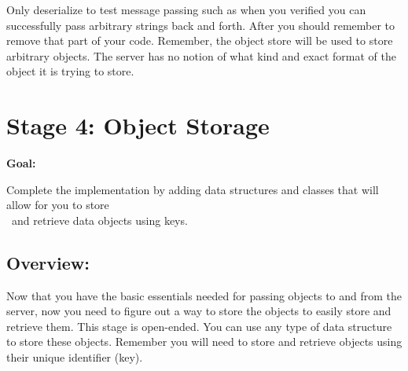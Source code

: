 \documentclass{article}
\begin{document}
\begin{info}
 Only deserialize to test message passing such as when you verified you can successfully pass arbitrary strings back and forth. After you should remember to remove that part of your code. Remember, the object store will be used to store arbitrary objects. The server has no notion of what kind and exact format of the object it is trying to store. 
\end{info}

\newpage
\section{Stage 4: Object Storage} %
\begin{large}\textbf{Goal:}\end{large} Complete the implementation by adding data structures and classes that will allow for you to store \\ \indent \indent \-\ and retrieve data objects using keys. 

\subsection*{Overview:}
Now that you have the basic essentials needed for passing objects to and from the server, now you need to figure out a way to store the objects to easily store and retrieve them. This stage is open-ended. You can use any type of data structure to store these objects. Remember you will need to store and retrieve objects using their unique identifier (key).
\end{document}
